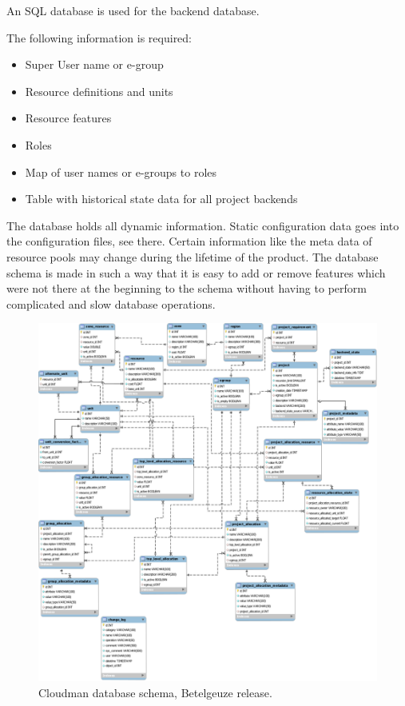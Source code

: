 An SQL database is used for the backend database. 

The following information is required:
\begin{itemize}
\item Super User name or e-group
\item Resource definitions and units
\item Resource features 
\item Roles
\item Map of user names or e-groups to roles
\item Table with historical state data for all project backends
\end{itemize}

The database holds all dynamic information. Static configuration data goes into the configuration files, see there. 
Certain information like the meta data of resource pools may change during the lifetime of the product. The database schema is made in such a way that it is easy to add or remove features which were not there at the beginning to the schema without having to perform complicated and slow database operations. 

\begin{figure}
\begin{center}
\includegraphics[width=\textwidth]{cloudman_db.eps}
\caption{\label{ddb_schema_new} Cloudman database schema, Betelgeuze release.}
\end{center}
\end{figure}

